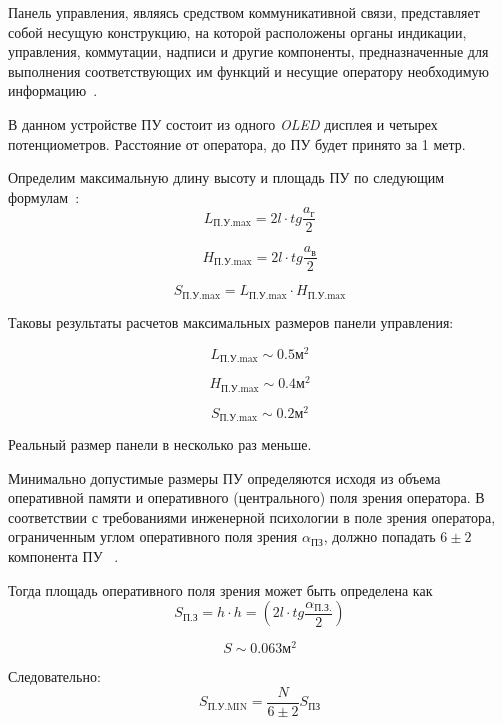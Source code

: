 Панель управления, являясь средством коммуникативной связи,
представляет собой несущую конструкцию, на которой расположены органы индикации,
управления, коммутации, надписи и другие компоненты, предназначенные для
выполнения соответствующих им функций и несущие оператору необходимую
информацию~\cite{Alipherenko2007}.

В данном устройстве ПУ состоит из одного \textit{OLED} дисплея и четырех
потенциометров. Расстояние от оператора, до ПУ будет принято за 1 метр.

Определим максимальную длину высоту и площадь ПУ по следующим
формулам~\cite{Alipherenko2007}:
\begin{equation}
  L_{\textrm{П.У.max}} = 2l \cdot tg\frac{a_{\textrm{г}}}{2}
\end{equation}

\begin{equation}
  H_{\textrm{П.У.max}} = 2l \cdot tg\frac{a_{\textrm{в}}}{2}
\end{equation}

\begin{equation}
  S_{\textrm{П.У.max}} =   L_{\textrm{П.У.max}} \cdot   H_{\textrm{П.У.max}}
\end{equation}

Таковы результаты расчетов максимальных размеров панели управления:

$$L_{\textrm{П.У.max}} \sim 0.5 \textrm{м}^2$$

$$H_{\textrm{П.У.max}} \sim 0.4 \textrm{м}^2$$

$$S_{\textrm{П.У.max}} \sim 0.2 \textrm{м}^2$$

Реальный размер панели в несколько раз меньше.

Минимально допустимые размеры ПУ определяются исходя из объема
оперативной памяти и оперативного (центрального) поля зрения
оператора. В соответствии с требованиями инженерной психологии в поле
зрения оператора, ограниченным углом оперативного поля зрения $\alpha_{\textrm{ПЗ}}$,
должно попадать $6\pm 2$ компонента ПУ ~\cite{Alipherenko2007}.


Тогда площадь оперативного поля зрения может быть определена как
\begin{equation}
  S_{\textrm{П.З}} = h \cdot h = \left( 2l \cdot tg\frac{\alpha_{\textrm{П.З.}}}{2} \right)
\end{equation}

$$S \sim 0.063\textrm{м}^2$$

Следовательно:
\begin{equation}
  S_{\textrm{П.У.MIN}} = \frac{N}{6 \pm 2} S_{\textrm{ПЗ}}
\end{equation}

